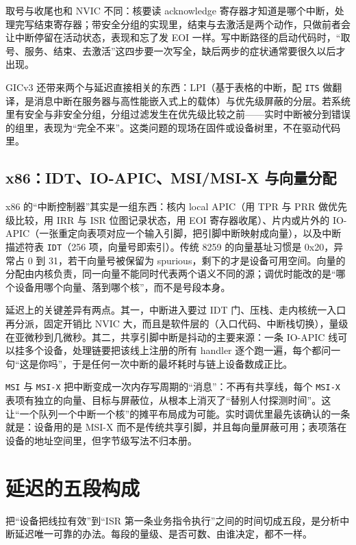\documentclass[12pt,a4paper,fontset=fandol]{ctexbook}
\newcommand{\Tp}[1]{\texttt{#1}}
\begin{document}
取号与收尾也和 NVIC 不同：核要读 acknowledge 寄存器才知道是哪个中断，处理完写结束寄存器；带安全分组的实现里，结束与去激活是两个动作，只做前者会让中断停留在活动状态，表现和忘了发 EOI 一样。写中断路径的启动代码时，``取号、服务、结束、去激活''这四步要一次写全，缺后两步的症状通常要很久以后才出现。

GICv3 还带来两个与延迟直接相关的东西：LPI（基于表格的中断，配 \Tp{ITS} 做翻译，是消息中断在服务器与高性能嵌入式上的载体）与优先级屏蔽的分层。若系统里有安全与非安全分组，分组过滤发生在优先级比较之前——实时中断被分到错误的组里，表现为``完全不来''。这类问题的现场在固件或设备树里，不在驱动代码里。

\subsection{x86：IDT、IO-APIC、MSI/MSI-X 与向量分配}

x86 的``中断控制器''其实是一组东西：核内 local APIC（用 TPR 与 PRR 做优先级比较，用 IRR 与 ISR 位图记录状态，用 EOI 寄存器收尾）、片内或片外的 IO-APIC（一张重定向表项对应一个输入引脚，把引脚中断映射成向量），以及中断描述符表 \Tp{IDT}（256 项，向量号即索引）。传统 8259 的向量基址习惯是 0x20，异常占 0 到 31，若干向量号被保留为 spurious，剩下的才是设备可用空间。向量的分配由内核负责，同一向量不能同时代表两个语义不同的源；调优时能改的是``哪个设备用哪个向量、落到哪个核''，而不是号段本身。

延迟上的关键差异有两点。其一，中断进入要过 IDT 门、压栈、走内核统一入口再分派，固定开销比 NVIC 大，而且是软件层的（入口代码、中断栈切换），量级在亚微秒到几微秒。其二，共享引脚中断是抖动的主要来源：一条 IO-APIC 线可以挂多个设备，处理链要把该线上注册的所有 handler 逐个跑一遍，每个都问一句``这是你吗''，于是任何一次中断的最坏耗时与链上设备数成正比。

\Tp{MSI} 与 \Tp{MSI-X} 把中断变成一次内存写周期的``消息''：不再有共享线，每个 \Tp{MSI-X} 表项有独立的向量、目标与屏蔽位，从根本上消灭了``替别人付探测时间''。这让``一个队列一个中断一个核''的摊平布局成为可能。实时调优里最先该确认的一条就是：设备用的是 MSI-X 而不是传统共享引脚，并且每向量屏蔽可用；表项落在设备的地址空间里，但字节级写法不归本册。

\section{延迟的五段构成}

把``设备把线拉有效''到``ISR 第一条业务指令执行''之间的时间切成五段，是分析中断延迟唯一可靠的办法。每段的量级、是否可数、由谁决定，都不一样。
\end{document}
